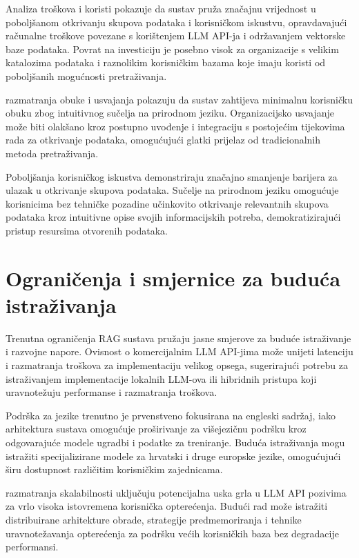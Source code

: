 Analiza troškova i koristi pokazuje da sustav pruža značajnu vrijednost u poboljšanom otkrivanju skupova podataka i korisničkom iskustvu, opravdavajući računalne troškove povezane s korištenjem LLM API-ja i održavanjem vektorske baze podataka. Povrat na investiciju je posebno visok za organizacije s velikim katalozima podataka i raznolikim korisničkim bazama koje imaju koristi od poboljšanih mogućnosti pretraživanja.

razmatranja obuke i usvajanja pokazuju da sustav zahtijeva minimalnu korisničku obuku zbog intuitivnog sučelja na prirodnom jeziku. Organizacijsko usvajanje može biti olakšano kroz postupno uvođenje i integraciju s postojećim tijekovima rada za otkrivanje podataka, omogućujući glatki prijelaz od tradicionalnih metoda pretraživanja.

Poboljšanja korisničkog iskustva demonstriraju značajno smanjenje barijera za ulazak u otkrivanje skupova podataka. Sučelje na prirodnom jeziku omogućuje korisnicima bez tehničke pozadine učinkovito otkrivanje relevantnih skupova podataka kroz intuitivne opise svojih informacijskih potreba, demokratizirajući pristup resursima otvorenih podataka.

\section{Ograničenja i smjernice za buduća istraživanja}
\label{sec:limitations_future_work}

Trenutna ograničenja RAG sustava pružaju jasne smjerove za buduće istraživanje i razvojne napore. Ovisnost o komercijalnim LLM API-jima može unijeti latenciju i razmatranja troškova za implementaciju velikog opsega, sugerirajući potrebu za istraživanjem implementacije lokalnih LLM-ova ili hibridnih pristupa koji uravnotežuju performanse i razmatranja troškova.

Podrška za jezike trenutno je prvenstveno fokusirana na engleski sadržaj, iako arhitektura sustava omogućuje proširivanje za višejezičnu podršku kroz odgovarajuće modele ugradbi i podatke za treniranje. Buduća istraživanja mogu istražiti specijalizirane modele za hrvatski i druge europske jezike, omogućujući širu dostupnost različitim korisničkim zajednicama.

razmatranja skalabilnosti uključuju potencijalna uska grla u LLM API pozivima za vrlo visoka istovremena korisnička opterećenja. Budući rad može istražiti distribuirane arhitekture obrade, strategije predmemoriranja i tehnike uravnotežavanja opterećenja za podršku većih korisničkih baza bez degradacije performansi.

